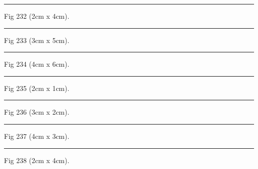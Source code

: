 \documentclass[a4paper,11pt]{article}
\begin{document}
\begin{swarmwrap}%
  \begin{minipage}[t]{2cm}
    \centering
    \rule{\linewidth}{4cm}
    {\footnotesize Fig 232 (2cm x 4cm).}
  \end{minipage}%
\end{swarmwrap}%
\swarmwrapnext
\lipsum[82]%

\begin{swarmwrap}%
  \begin{minipage}[t]{3cm}
    \centering
    \rule{\linewidth}{5cm}
    {\footnotesize Fig 233 (3cm x 5cm).}
  \end{minipage}%
\end{swarmwrap}%
\swarmwrapnext
\lipsum[83]%

\begin{swarmwrap}%
  \begin{minipage}[t]{4cm}
    \centering
    \rule{\linewidth}{6cm}
    {\footnotesize Fig 234 (4cm x 6cm).}
  \end{minipage}%
\end{swarmwrap}%
\swarmwrapnext
\lipsum[84]%

\begin{swarmwrap}%
  \begin{minipage}[t]{2cm}
    \centering
    \rule{\linewidth}{1cm}
    {\footnotesize Fig 235 (2cm x 1cm).}
  \end{minipage}%
\end{swarmwrap}%
\swarmwrapnext
\lipsum[85]%

\begin{swarmwrap}%
  \begin{minipage}[t]{3cm}
    \centering
    \rule{\linewidth}{2cm}
    {\footnotesize Fig 236 (3cm x 2cm).}
  \end{minipage}%
\end{swarmwrap}%
\swarmwrapnext
\lipsum[86]%

\begin{swarmwrap}%
  \begin{minipage}[t]{4cm}
    \centering
    \rule{\linewidth}{3cm}
    {\footnotesize Fig 237 (4cm x 3cm).}
  \end{minipage}%
\end{swarmwrap}%
\swarmwrapnext
\lipsum[87]%

\begin{swarmwrap}%
  \begin{minipage}[t]{2cm}
    \centering
    \rule{\linewidth}{4cm}
    {\footnotesize Fig 238 (2cm x 4cm).}
  \end{minipage}%
\end{swarmwrap}%
\swarmwrapnext
\lipsum[88]%
\end{document}
